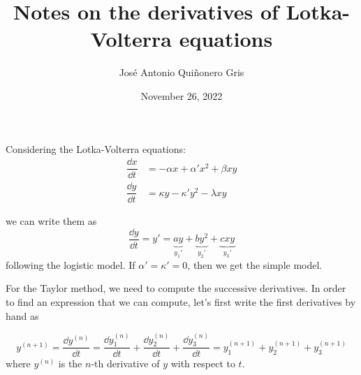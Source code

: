 \documentclass[12pt, a4paper]{article}
\author{José Antonio Quiñonero Gris}
\title{
    \textbf{Notes on the derivatives of Lotka-Volterra equations}
      }
\date{
November 26, 2022
}
\begin{document}
\maketitle


Considering the Lotka-Volterra equations:
\begin{align}
    \dfrac{\dd{x}}{\dd{t}} &= - \alpha x + \alpha' x^2 + \beta x y \\
    \dfrac{\dd{y}}{\dd{t}} &= \kappa y - \kappa' y^2 - \lambda x y
\end{align}

we can write them as
\begin{equation}\label{ec:main}
    \dfrac{\dd{y}}{\dd{t}} = y' =
    \underbrace{a y}_{y_1'}
    + \underbrace{b y^2}_{y_2'}
    + \underbrace{c x y}_{y_3'}
\end{equation}
following the logistic model. If $\alpha' = \kappa' = 0$, then we get the simple model.

For the Taylor method, we need to compute the successive derivatives. In order to find an expression that we can compute, let's first write the first derivatives by hand
as

\begin{equation}
    y^{(n+1)} = \dfrac{ \dd{y^{(n)}} }{\dd{t}} =
    \dfrac{ \dd{y_1^{(n)}} }{\dd{t}} +
    \dfrac{ \dd{y_2^{(n)}} }{\dd{t}} +
    \dfrac{ \dd{y_3^{(n)}} }{\dd{t}} =
    y_1^{(n+1)} + y_2^{(n+1)} + y_3^{(n+1)}
\end{equation}
where $y^{(n)}$ is the $n$-th derivative of $y$ with respect to $t$.
\end{document}
